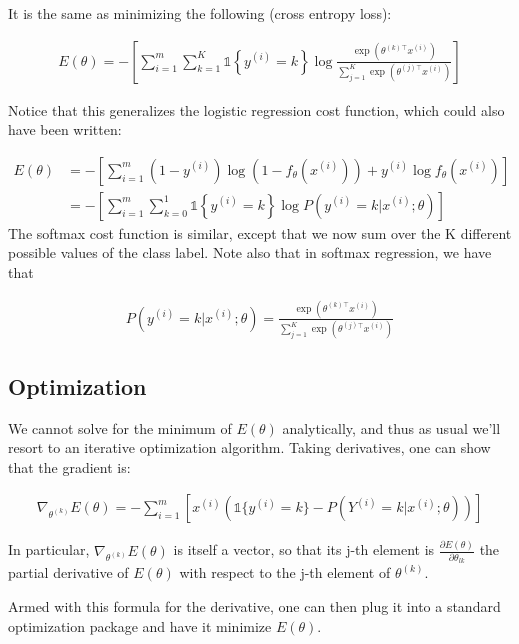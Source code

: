 It is the same as minimizing the following (cross entropy loss):

\begin{align} 
	E(\theta) = - \left[ \sum_{i=1}^{m} \sum_{k=1}^{K} \mathds{1}\left\{y^{(i)} = k\right\} \log \frac{\exp(\theta^{(k)\top} x^{(i)})}{\sum_{j=1}^K \exp(\theta^{(j)\top} x^{(i)})}\right] 
\end{align}

Notice that this generalizes the logistic regression cost function, which could also have been written:

\begin{align}
	E(\theta) &= - \left[ \sum_{i=1}^m (1-y^{(i)}) \log (1-f_\theta(x^{(i)})) + y^{(i)} \log f_\theta(x^{(i)}) \right] \\ 
			  &= - \left[ \sum_{i=1}^{m} \sum_{k=0}^{1} \mathds{1}\left\{y^{(i)} = k\right\} \log P(y^{(i)} = k | x^{(i)} ; \theta) \right] 
\end{align}
The softmax cost function is similar, except that we now sum over the K different possible values of the class label. Note also that in softmax regression, we have that

\begin{align}
	P(y^{(i)} = k | x^{(i)} ; \theta) = \frac{\exp(\theta^{(k)\top} x^{(i)})}{\sum_{j=1}^K \exp(\theta^{(j)\top} x^{(i)}) }
\end{align}

\subsection{Optimization}

We cannot solve for the minimum of $E(\theta)$ analytically, and thus as usual we’ll resort to an iterative optimization algorithm. Taking derivatives, one can show that the gradient is:

\begin{align} \nabla_{\theta^{(k)}} E(\theta) = - \sum_{i=1}^{m}{ \left[ x^{(i)} \left( \mathds{1} \{ y^{(i)} = k\} - P(Y^{(i)} = k | x^{(i)}; \theta) \right) \right] } \end{align}

In particular, $\nabla_{\theta^{(k)}} E(\theta)$ is itself a vector, so that its j-th element is $\frac{\partial E(\theta)}{\partial \theta_{lk}}$ the partial derivative of $E(\theta)$ with respect to the j-th element of $\theta^{(k)}$.

Armed with this formula for the derivative, one can then plug it into a standard optimization package and have it minimize $E(\theta)$.

